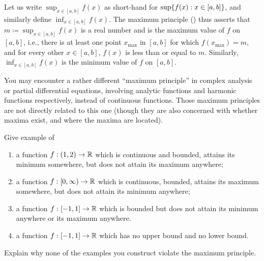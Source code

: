 \begin{note}
  Let us write \(\sup_{x \in [a, b]} f(x)\) as short-hand for \(\sup\set{f(x) : x \in [a, b]}\), and similarly define \(\inf_{x \in [a, b]} f(x)\).
  The maximum principle () thus asserts that \(m \coloneqq \sup_{x \in [a, b]} f(x)\) is a real number and is the maximum value of \(f\) on \([a, b]\), i.e., there is at least one point \(x_{\max}\) in \([a, b]\) for which \(f(x_{\max}) = m\), and for every other \(x \in [a, b]\), \(f(x)\) is less than or equal to \(m\).
  Similarly, \(\inf_{x \in [a, b]} f(x)\) is the minimum value of \(f\) on \([a, b]\).
\end{note}

\begin{rmk}\label{i:9.6.9}
  You may encounter a rather different ``maximum principle'' in complex analysis or partial differential equations, involving analytic functions and harmonic functions respectively, instead of continuous functions.
  Those maximum principles are not directly related to this one
  (though they are also concerned with whether maxima exist, and where the maxima are located).
\end{rmk}

\exercisesection

\begin{ex}\label{i:ex:9.6.1}
  Give example of
  \begin{enumerate}
    \item a function \(f : (1, 2) \to \mathbb{R}\) which is continuous and bounded, attains its minimum somewhere, but does not attain its maximum anywhere;
    \item a function \(f : [0, \infty) \to \mathbb{R}\) which is continuous, bounded, attains its maximum somewhere, but does not attain its minimum anywhere;
    \item a function \(f : [-1, 1] \to \mathbb{R}\) which is bounded but does not attain its minimum anywhere or its maximum anywhere.
    \item a function \(f : [-1, 1] \to \mathbb{R}\) which has no upper bound and no lower bound.
  \end{enumerate}
  Explain why none of the examples you construct violate the maximum principle.
\end{ex}

